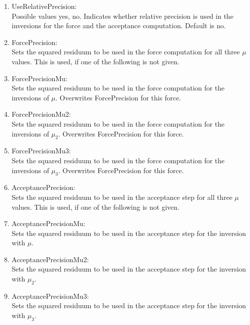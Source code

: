 \begin{enumerate}
\item {\ttfamily UseRelativePrecision}:\\
  Possible values {\ttfamily yes, no}. Indicates whether relative
  precision is used in the inversions for the force and the acceptance
  computation. Default is no.

\item {\ttfamily ForcePrecision}:\\
  Sets the squared residuum to be used in the force computation for
  all three $\mu$ values. This is used, if one of the following is not
  given.

\item {\ttfamily ForcePrecisionMu}:\\
  Sets the squared residuum to be used in the force computation for
  the inversions of $\mu$. Overwrites {\ttfamily ForcePrecision}
  for this force.

\item {\ttfamily ForcePrecisionMu2}:\\
  Sets the squared residuum to be used in the force computation for
  the inversions of $\mu_2$. Overwrites {\ttfamily ForcePrecision}
  for this force.

\item {\ttfamily ForcePrecisionMu3}:\\
  Sets the squared residuum to be used in the force computation for
  the inversions of $\mu_3$. Overwrites {\ttfamily ForcePrecision}
  for this force.

\item {\ttfamily AcceptancePrecision}:\\
  Sets the squared residuum to be used in the acceptance step for
  all three $\mu$ values. This is used, if one of the following is not
  given.

\item {\ttfamily AcceptancePrecisionMu}:\\
  Sets the squared residuum to be used in the acceptance step for
  the inversion with $\mu$.

\item {\ttfamily AcceptancePrecisionMu2}:\\
  Sets the squared residuum to be used in the acceptance step for
  the inversion with $\mu_2$.

\item {\ttfamily AcceptancePrecisionMu3}:\\
  Sets the squared residuum to be used in the acceptance step for
  the inversion with $\mu_3$.


\end{enumerate}
